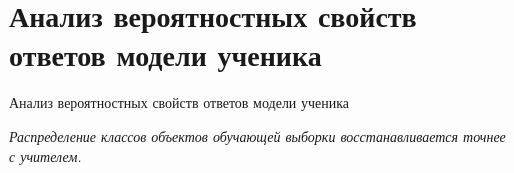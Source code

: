 \documentclass[10pt,pdf,hyperref={unicode}]{beamer}
\begin{document}
\section{Анализ вероятностных свойств ответов модели ученика}
\begin{frame}{Анализ вероятностных свойств ответов модели ученика}
\justifying
~\\[-8mm]
\begin{figure}[h!]
\end{figure}
{\emph{Распределение классов объектов обучающей выборки восстанавливается точнее с учителем.}}


\end{frame}
\end{document}

